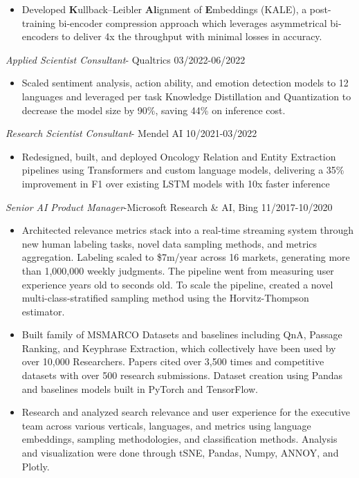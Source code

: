 \documentclass[line,margin]{res}
\begin{document}
\begin{resume}
\begin{itemize}
\item Developed \textbf{K}ullback–Leibler \textbf{Al}ignment of \textbf{E}mbeddings (KALE), a post-training bi-encoder compression approach which leverages asymmetrical bi-encoders to deliver 4x the throughput with minimal losses in accuracy. 
\end{itemize}
{\sl Applied Scientist Consultant}- Qualtrics \hfill 03/2022-06/2022
\begin{itemize}  \itemsep -4pt 
\item Scaled sentiment analysis, action ability, and emotion detection models to 12 languages and leveraged per task Knowledge Distillation and Quantization to decrease the model size by 90\%, saving 44\% on inference cost. 
\end{itemize}
{\sl Research Scientist Consultant}- Mendel AI \hfill 10/2021-03/2022
\begin{itemize}  \itemsep -4pt 
\item Redesigned, built, and deployed Oncology Relation and Entity Extraction pipelines using Transformers and custom language models, delivering a 35\% improvement in F1 over existing LSTM models with 10x faster inference
\end{itemize}
{\sl Senior AI Product Manager}-Microsoft Research \& AI,  Bing  \hfill 11/2017-10/2020
\begin{itemize}  \itemsep -4pt 
\item Architected relevance metrics stack into a real-time streaming system through new human labeling tasks, novel data sampling methods, and metrics aggregation. Labeling scaled to \$7m/year across 16 markets, generating more than 1,000,000 weekly judgments. The pipeline went from measuring user experience years old to seconds old. To scale the pipeline, created a novel multi-class-stratified sampling method using the Horvitz-Thompson estimator.
\item  Built family of MSMARCO Datasets and baselines including QnA, Passage Ranking, and Keyphrase Extraction, which collectively have been used by over 10,000 Researchers. Papers cited over 3,500 times and competitive datasets with over 500 research submissions. Dataset creation using Pandas and baselines models built in PyTorch and TensorFlow.
\item Research and analyzed search relevance and user experience for the executive team across various verticals, languages, and metrics using language embeddings, sampling methodologies, and classification methods. Analysis and visualization were done through tSNE, Pandas, Numpy, ANNOY, and Plotly.

\end{itemize}
\end{resume}
\end{document}
